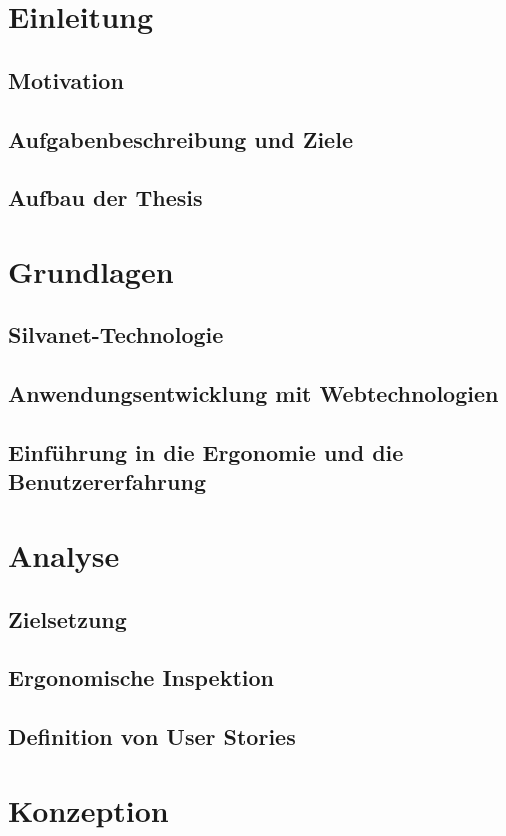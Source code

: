 \chapter{Einleitung}
\section{Motivation}
\section{Aufgabenbeschreibung und Ziele}
\section{Aufbau der Thesis}

\chapter{Grundlagen}
\section{Silvanet-Technologie}
\section{Anwendungsentwicklung mit Webtechnologien}
\section{Einführung in die Ergonomie und die Benutzererfahrung}

\chapter{Analyse}
\section{Zielsetzung}
\section{Ergonomische Inspektion}
\section{Definition von User Stories}

\chapter{Konzeption}
